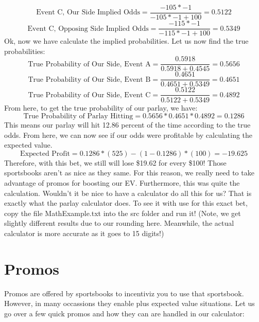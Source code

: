 \documentclass{article}
\begin{document}
\begin{equation}
  \textrm{Event C, Our Side Implied Odds} = \frac{-105*-1}{-105*-1+100} = 0.5122
\end{equation}
\begin{equation}
  \textrm{Event C, Opposing Side Implied Odds} = \frac{-115*-1}{-115*-1+100} = 0.5349
\end{equation}
Ok, now we have calculate the implied probabilities. Let us now find the true probabilities:
\begin{equation}
  \textrm{True Probability of Our Side, Event A} = \frac{0.5918}{0.5918+0.4545} = 0.5656
\end{equation}
\begin{equation}
  \textrm{True Probability of Our Side, Event B} = \frac{0.4651}{0.4651+0.5349} = 0.4651
\end{equation}
\begin{equation}
  \textrm{True Probability of Our Side, Event C} = \frac{0.5122}{0.5122+0.5349} = 0.4892
\end{equation}
From here, to get the true probability of our parlay, we have:
\begin{equation}
  \textrm{True Probability of Parlay Hitting} = 0.5656*0.4651*0.4892 = 0.1286
\end{equation}
This means our parlay will hit 12.86 percent of the time according to the true odds. 
From here, we can now see if our odds were profitable by calculating the expected value.
\begin{equation}
  \textrm{Expected Profit} = 0.1286*(525) - (1-0.1286)*(100) = -19.625
\end{equation}
Therefore, with this bet, we still will lose \$19.62 for every \$100! Those sportsbooks aren't as nice as they same. For this reason, we really need to take advantage of promos for boosting our EV. Furthermore, this was quite the calculation. Wouldn't it be nice to have a calculator do all this for us? That is exactly what the parlay calculator does. To see it with use for this exact bet, copy the file MathExample.txt into the src folder and run it! (Note, we get slightly different results due to our rounding here. Meanwhile, the actual calculator is more accurate as it goes to 15 digits!)

\section{Promos}
Promos are offered by sportsbooks to incentiviz you to use that sportsbook. However, in many occassions they enable plus expected value situations. Let us go over a few quick promos and how they can are handled in our calculator:
\end{document}

